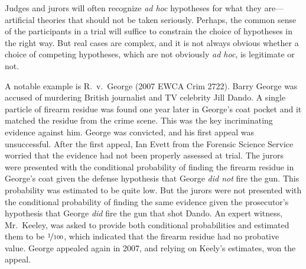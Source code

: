 \documentclass{article}
\newcommand{\pr}{\mathsf{Pr}}
\begin{document}
Judges and jurors will often recognize \textit{ad hoc} hypotheses for what they are---artificial theories that should not be taken seriously. Perhaps, the common sense of the participants in a trial will suffice to constrain the choice of hypotheses in the right way. But real cases are complex, and it is not always obvious whether a choice of competing hypotheses, which are not obviously \textit{ad hoc}, is legitimate or not. 


 
 A notable example is R.\ v.\  
George (2007 EWCA Crim 2722). Barry George was accused of murdering British journalist and TV celebrity Jill Dando. 
%
	A single particle of firearm  residue %
	 was found one year later in George's coat pocket and it matched the residue from the crime scene.
	 This was the key incriminating evidence against him. 
%
George was convicted, and his first appeal was unsuccessful. 
%
After the first appeal, Ian Evett from the Forensic Science Service worried that the evidence had not been properly assessed at trial. The jurors  were presented with the conditional probability 
of finding the  firearm residue in George's coat given the defense hypothesis %
that George \textit{did not} fire the gun. This probability was estimated to be quite low. 
But the jurors were not presented with the conditional probability 
of finding the same evidence given the prosecutor's hypothesis 
that George \textit{did} fire the gun that shot Dando.
%
%
\noindent 
An expert witness, Mr.\ Keeley, was asked to provide both conditional probabilities and estimated them to be $\nicefrac{1}{100}$, which indicated that the firearm residue had no probative value. 
George appealed again in 2007, and relying on Keely's estimates, won the appeal.
%
\end{document}
